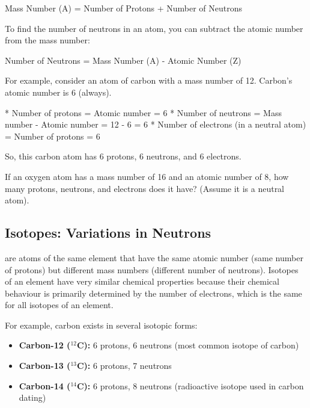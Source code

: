 Mass Number (A) = Number of Protons + Number of Neutrons

To find the number of neutrons in an atom, you can subtract the atomic number from the mass number:

Number of Neutrons = Mass Number (A) - Atomic Number (Z)

For example, consider an atom of carbon with a mass number of 12. Carbon's atomic number is 6 (always).

* Number of protons = Atomic number = 6
* Number of neutrons = Mass number - Atomic number = 12 - 6 = 6
* Number of electrons (in a neutral atom) = Number of protons = 6

So, this carbon atom has 6 protons, 6 neutrons, and 6 electrons.

\begin{stopandthink}
If an oxygen atom has a mass number of 16 and an atomic number of 8, how many protons, neutrons, and electrons does it have? (Assume it is a neutral atom).
\end{stopandthink}


\subsection{Isotopes: Variations in Neutrons}


 are atoms of the same element that have the same atomic number (same number of protons) but different mass numbers (different number of neutrons).  Isotopes of an element have very similar chemical properties because their chemical behaviour is primarily determined by the number of electrons, which is the same for all isotopes of an element.

For example, carbon exists in several isotopic forms:

\begin{itemize}
    \item \textbf{Carbon-12 ($^{12}$C):}  6 protons, 6 neutrons (most common isotope of carbon)
    \item \textbf{Carbon-13 ($^{13}$C):}  6 protons, 7 neutrons
    \item \textbf{Carbon-14 ($^{14}$C):}  6 protons, 8 neutrons (radioactive isotope used in carbon dating)
\end{itemize}

